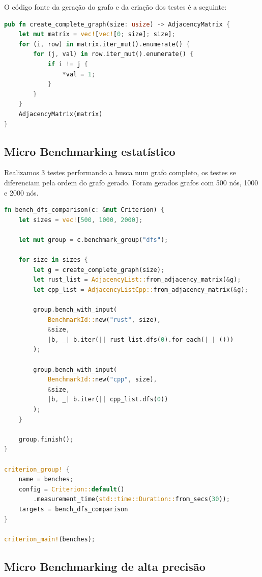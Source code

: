 O código fonte da geração do grafo e da
criação dos testes é a seguinte:

\begin{lstlisting}[language=Rust, caption={Código fonte da geração do grafo completo}]
pub fn create_complete_graph(size: usize) -> AdjacencyMatrix {
    let mut matrix = vec![vec![0; size]; size];
    for (i, row) in matrix.iter_mut().enumerate() {
        for (j, val) in row.iter_mut().enumerate() {
            if i != j {
                *val = 1;
            }
        }
    }
    AdjacencyMatrix(matrix)
}
\end{lstlisting}

\subsection{Micro Benchmarking estatístico}

Realizamos 3 testes performando a busca num grafo completo, os testes
se diferenciam pela ordem do grafo gerado. Foram gerados grafos com
500 nós, 1000 e 2000 nós.

\begin{lstlisting}[language=Rust, label={code:micro-dfs}, caption={Código fonte dos testes de Micro Benchmark estatístico da DFS.}]
fn bench_dfs_comparison(c: &mut Criterion) {
    let sizes = vec![500, 1000, 2000];

    let mut group = c.benchmark_group("dfs");

    for size in sizes {
        let g = create_complete_graph(size);
        let rust_list = AdjacencyList::from_adjacency_matrix(&g);
        let cpp_list = AdjacencyListCpp::from_adjacency_matrix(&g);

        group.bench_with_input(
            BenchmarkId::new("rust", size),
            &size,
            |b, _| b.iter(|| rust_list.dfs(0).for_each(|_| ()))
        );

        group.bench_with_input(
            BenchmarkId::new("cpp", size),
            &size,
            |b, _| b.iter(|| cpp_list.dfs(0))
        );
    }

    group.finish();
}

criterion_group! {
    name = benches;
    config = Criterion::default()
        .measurement_time(std::time::Duration::from_secs(30));
    targets = bench_dfs_comparison
}

criterion_main!(benches);
\end{lstlisting}

\subsection{Micro Benchmarking de alta precisão}

